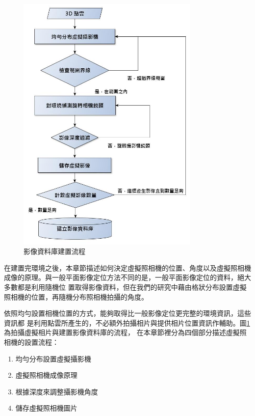 \begin{figure}
\begin{center}
  \includegraphics[width=0.8\textwidth]{figures/Virtual_Image_Database.jpg}
  \caption{影像資料庫建置流程}
  \label{fig:Environment Building Process}  
\end{center}
\end{figure}	

	在建置完環境之後，本章節描述如何決定虛擬照相機的位置、角度以及虛擬照相機成像的原理。與一般平面影像定位方法不同的是，一般平面影像定位的資料，絕大多數都是利用隨機位
	置取得影像資料，但在我們的研究中藉由格狀分布設置虛擬照相機的位置，再隨機分布照相機拍攝的角度。
	
	依照均勻設置相機位置的方式，能夠取得比一般影像定位更完整的環境資訊，這些資訊都
	是利用點雲所產生的，不必額外拍攝相片與提供相片位置資訊作輔助。圖\ref{fig:Environment Building Process}為拍攝虛擬相片與建置影像資料庫的流程，
	在本章節裡分為四個部分描述虛擬照相機的設置流程：
	
	\begin{enumerate}
		\item 均勻分布設置虛擬攝影機
    	\item 虛擬照相機成像原理
    	\item 根據深度來調整攝影機角度
    	\item 儲存虛擬照相機圖片
	\end{enumerate}		


